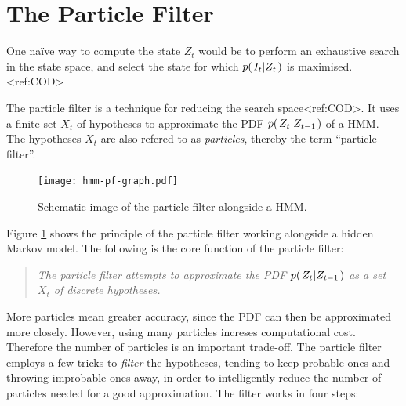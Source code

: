 %
%

%
%

%
%


\section{The Particle Filter}

One na\"{i}ve way to compute the state $Z_t$ would be to perform an exhaustive search in the state space, and select the state for which $p{(\left. I_t \middle\vert Z_t \right.)}$ is maximised.<ref:COD> 

The particle filter is a technique for reducing the search space<ref:COD>. It uses a finite set $X_t$ of hypotheses to approximate the PDF $p{(\left. Z_t \middle\vert Z_{t-1} \right.)}$ of a HMM. The hypotheses $X_t$ are also refered to as \emph{particles}, thereby the term ``particle filter''.

\begin{figure}
  \centering
  \texttt{[image: hmm-pf-graph.pdf]}
  \caption{Schematic image of the particle filter alongside a HMM.}
  \label{fig:hmm-graph}
\end{figure}

Figure \ref{fig:hmm-graph} shows the principle of the particle filter working alongside a hidden Markov model. The following is the core function of the particle filter:

\begin{quote}
  \emph{The particle filter attempts to approximate the PDF $p{(\left. Z_t \middle\vert Z_{t-1} \right.)}$ as a set $X_t$ of discrete hypotheses.}
\end{quote}

More particles mean greater accuracy, since the PDF can then be approximated more closely. However, using many particles increses computational cost.
Therefore the number of particles is an important trade-off. 
The particle filter employs a few tricks to \emph{filter} the hypotheses, 
tending to keep probable ones and throwing improbable ones away, in order to intelligently reduce the number 
of particles needed for a good approximation. The filter works in four steps:

